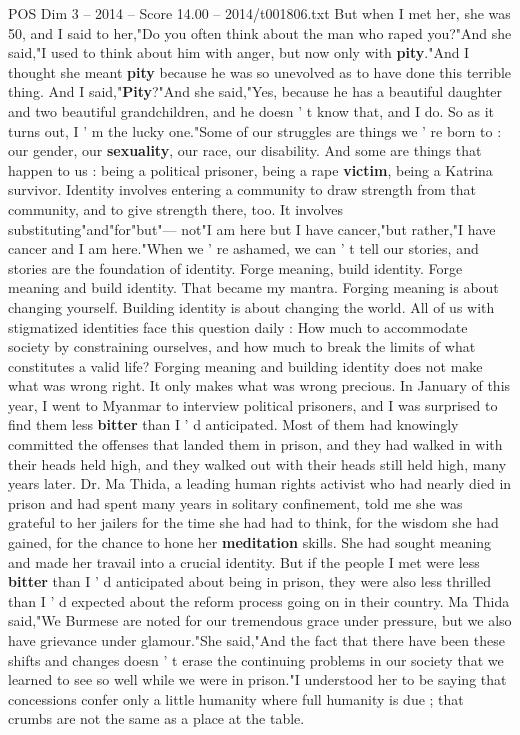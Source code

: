 \begin{textsample}{POS Dim 3 – 2014 – Score 14.00 – 2014/t001806.txt}
But when I met her, she was 50, and I said to her,"Do you often think about the man who raped you?"And she said,"I used to think about him with anger, but now only with \textbf{pity}."And I thought she meant \textbf{pity} because he was so unevolved as to have done this terrible thing.
And I said,"\textbf{Pity}?"And she said,"Yes, because he has a beautiful daughter and two beautiful grandchildren, and he doesn ' t know that, and I do.
So as it turns out, I ' m the lucky one."Some of our struggles are things we ' re born to : our gender, our \textbf{sexuality}, our race, our disability.
And some are things that happen to us : being a political prisoner, being a rape \textbf{victim}, being a Katrina survivor.
Identity involves entering a community to draw strength from that community, and to give strength there, too.
It involves substituting"and"for"but"— not"I am here but I have cancer,"but rather,"I have cancer and I am here."When we ' re ashamed, we can ' t tell our stories, and stories are the foundation of identity.
Forge meaning, build identity.
Forge meaning and build identity.
That became my mantra.
Forging meaning is about changing yourself.
Building identity is about changing the world.
All of us with stigmatized identities face this question daily : How much to accommodate society by constraining ourselves, and how much to break the limits of what constitutes a valid life?
Forging meaning and building identity does not make what was wrong right.
It only makes what was wrong precious.
In January of this year, I went to Myanmar to interview political prisoners, and I was surprised to find them less \textbf{bitter} than I ' d anticipated.
Most of them had knowingly committed the offenses that landed them in prison, and they had walked in with their heads held high, and they walked out with their heads still held high, many years later.
Dr.
Ma Thida, a leading human rights activist who had nearly died in prison and had spent many years in solitary confinement, told me she was grateful to her jailers for the time she had had to think, for the wisdom she had gained, for the chance to hone her \textbf{meditation} skills.
She had sought meaning and made her travail into a crucial identity.
But if the people I met were less \textbf{bitter} than I ' d anticipated about being in prison, they were also less thrilled than I ' d expected about the reform process going on in their country.
Ma Thida said,"We Burmese are noted for our tremendous grace under pressure, but we also have grievance under glamour."She said,"And the fact that there have been these shifts and changes doesn ' t erase the continuing problems in our society that we learned to see so well while we were in prison."I understood her to be saying that concessions confer only a little humanity where full humanity is due ; that crumbs are not the same as a place at the table.

\end{textsample}
